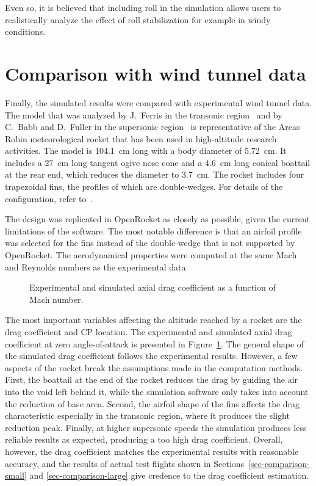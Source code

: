 Even so, it is believed that including roll in the simulation allows
users to realistically analyze the effect of roll stabilization for
example in windy conditions.


\section{Comparison with wind tunnel data}
\label{sec-comparison-windtunnel}


Finally, the simulated results were compared with experimental wind
tunnel data.  The model that was analyzed by J.~Ferris in the
transonic region~\cite{experimental-transonic} and by C.~Babb and
D.~Fuller in the supersonic region~\cite{experimental-supersonic} is
representative of the Arcas Robin meteorological rocket that has been
used in high-altitude research activities.  The model is 104.1~cm long
with a body diameter of 5.72~cm.  It includes a 27~cm long tangent
ogive nose cone and a 4.6~cm long conical boattail at the rear end,
which reduces the diameter to 3.7~cm.  The rocket includes four
trapezoidal fins, the profiles of which are double-wedges.  For
details of the configuration, refer to~\cite{experimental-transonic}.

The design was replicated in OpenRocket as closely as possible,
given the current limitations of the software.  The most notable
difference is that an airfoil profile was selected for the fins
instead of the double-wedge that is not supported by OpenRocket.  The
aerodynamical properties were computed at the same Mach and Reynolds
numbers as the experimental data.


\begin{figure}[t]
\centering
{}
\caption{Experimental and simulated axial drag coefficient as a
  function of Mach number.}
\label{fig-experimental-CA}
\end{figure}

The most important variables affecting the altitude reached by a
rocket are the drag coefficient and CP location.  The experimental and
simulated axial drag coefficient at zero angle-of-attack is presented
in Figure~\ref{fig-experimental-CA}.  The general shape of the
simulated drag coefficient follows the experimental results.  However,
a few aspects of the rocket break the assumptions made in the
computation methods.  First, the boattail at the end of the rocket
reduces the drag by guiding the air into the void left behind it,
while the simulation software only takes into account the reduction of
base area.  Second, the airfoil shape of the fins affects the drag
characteristic especially in the transonic region, where it produces
the slight reduction peak.  Finally, at higher supersonic speeds the
simulation produces less reliable results as expected, producing a too
high drag coefficient.  Overall, however, the drag coefficient matches
the experimental results with reasonable accuracy, and the results of
actual test flights shown in Sections~\ref{sec-comparison-small} and
\ref{sec-comparison-large} give credence to the drag coefficient
estimation.


